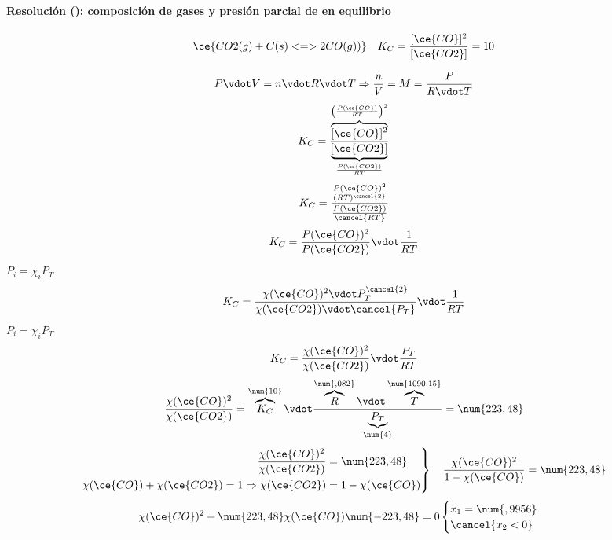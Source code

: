 \begin{frame}
	\frametitle{\ejerciciocmd}
	\framesubtitle{Resolución (): composición de gases y presión parcial de  en equilibrio}
	$$
		\ce{CO2(g) + C(s) <=> 2CO(g))}\quad K_C=\frac{[\ce{CO}]^2}{[\ce{CO2}]}=10
	$$
	\begin{overprint}
			$$
				P\vdot V = n\vdot R\vdot T\Rightarrow \frac{n}{V} = M =\frac{P}{R\vdot T}
			$$
		\onslide<2>
			$$
				K_C=\frac{\overbrace{[\ce{CO}]^2}^{\left(\frac{P(\ce{CO})}{RT}\right)^2}}{\underbrace{[\ce{CO2}]}_{\frac{P(\ce{CO2})}{RT}}}
			$$
		\onslide<3>
			$$
				K_C=\frac{\frac{P(\ce{CO})^2}{(RT)^{\cancel{2}}}}{\frac{P(\ce{CO2})}{\cancel{RT}}}
			$$
		\onslide<4>
			$$
				K_C=\frac{P(\ce{CO})^2}{P(\ce{CO2})}\vdot\frac{1}{RT}
			$$
		\onslide<5>
			 $P_i = \chi_i P_T$
			$$
				K_C=\frac{\chi(\ce{CO})^2\vdot P_T^{\cancel{2}}}{\chi(\ce{CO2})\vdot\cancel{P_T}}\vdot\frac{1}{RT}
			$$
		\onslide<6>
			 $P_i = \chi_i P_T$
			$$
				K_C=\frac{\chi(\ce{CO})^2}{\chi(\ce{CO2})}\vdot\frac{P_T}{RT}
			$$
		\onslide<7>
			$$
				\frac{\chi(\ce{CO})^2}{\chi(\ce{CO2})}=\overbrace{K_C}^{\num{10}}\vdot\frac{\overbrace{R}^{\num{,082}}\vdot\overbrace{T}^{\num{1090,15}}}{\underbrace{P_T}_{\num{4}}} = \num{223,48}
			$$
		\onslide<8>
			$$
				\left.\begin{aligned}
					\frac{\chi(\ce{CO})^2}{\chi(\ce{CO2})}&=\num{223,48}\\
					\chi(\ce{CO})+\chi(\ce{CO2})=1 \Rightarrow\chi(\ce{CO2})&=1-\chi(\ce{CO})
					\end{aligned}
				\right\}
				\quad\frac{\chi(\ce{CO})^2}{1-\chi(\ce{CO})}=\num{223,48}
			$$
		\onslide<9->
			$$
				\chi(\ce{CO})^2 + \num{223,48}\chi(\ce{CO})\num{-223,48}=0 
				\begin{cases} 
					x_1 =\num{,9956} \\
					\cancel{x_2 < 0}
				\end{cases}
$$
\end{overprint}
\end{frame}
